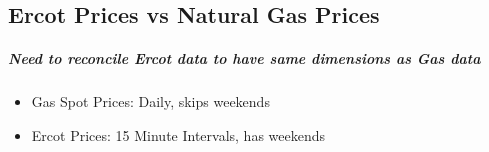 \documentclass[11pt]{article}
\begin{document}
    \begin{center}
    \end{center}
    { \hspace*{\fill} \\}
    
    \subsection{Ercot Prices vs Natural Gas
Prices}\label{ercot-prices-vs-natural-gas-prices}

\subparagraph{Need to reconcile Ercot data to have same dimensions as
Gas
data}\label{need-to-reconcile-ercot-data-to-have-same-dimensions-as-gas-data}

\begin{itemize}
\item
  Gas Spot Prices: Daily, skips weekends
\item
  Ercot Prices: 15 Minute Intervals, has weekends
\end{itemize}
\end{document}
